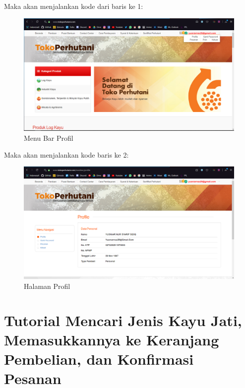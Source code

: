 Maka akan menjalankan kode dari baris ke 1:
\begin{figure}[h]
	\centering
	\includegraphics[scale=0.25]{figures/735menuprofile}
	\caption{Menu Bar Profil}
\end{figure}
\newpage
Maka akan menjalankan kode baris ke 2:
\begin{figure}[h]
	\centering
	\includegraphics[scale=0.25]{figures/735profilektp}
	\caption{Halaman Profil}
\end{figure}

\newpage
\section{Tutorial Mencari Jenis Kayu Jati, Memasukkannya ke Keranjang Pembelian, dan Konfirmasi Pesanan }

